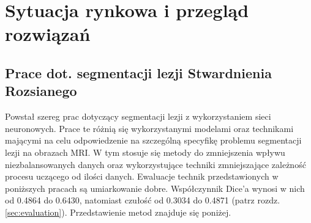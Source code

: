 \section{Sytuacja rynkowa i przegląd rozwiązań}
\label{sec:MarketAndSolutionsOverview}

\subsection{Prace dot. segmentacji lezji Stwardnienia Rozsianego}

\par
Powstał szereg prac dotyczący segmentacji lezji z wykorzystaniem sieci neuronowych. Prace te różnią się wykorzystanymi modelami oraz technikami mającymi na celu odpowiedzenie na szczególną specyfikę problemu segmentacji lezji na obrazach MRI. W tym stosuje się metody do zmniejszenia wpływu niezbalansowanych danych oraz wykorzystujące techniki zmniejszające zależność procesu uczącego od ilości danych. Ewaluacje technik przedstawionych w poniższych pracach są umiarkowanie dobre. Współczynnik Dice'a wynosi w nich od 0.4864 do 0.6430, natomiast czułość od 0.3034 do 0.4871\cite{Sadeghibakhi2022-ox} (patrz rozdz. \ref{sec:evaluation}). Przedstawienie metod znajduje się poniżej.


